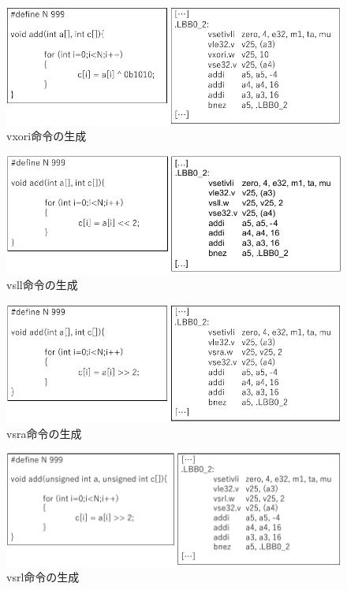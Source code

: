 \begin{figure}
    \centering
    \includegraphics[scale=0.8]{image/vxori.pdf}
    \caption{vxori命令の生成}
    \label{fig:vxori}
\end{figure}

\begin{figure}
    \centering
    \includegraphics[scale=0.8]{image/vsll.pdf}
    \caption{vsll命令の生成}
    \label{fig:vsll}
\end{figure}

\begin{figure}
    \centering
    \includegraphics[scale=0.8]{image/vsra.pdf}
    \caption{vsra命令の生成}
    \label{fig:vsra}
\end{figure}

\begin{figure}
    \centering
    \includegraphics[scale=0.8]{image/vsrl.pdf}
    \caption{vsrl命令の生成}
    \label{fig:vsrl}
\end{figure}